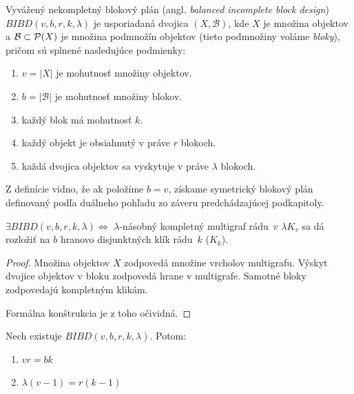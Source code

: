 \begin{definition}

Vyvážený nekompletný blokový plán (angl. \emph{balanced incomplete block design}) $BIBD(v, b, r, k, \lambda)$ je usporiadaná dvojica $(X, \mathcal{B})$, kde $X$ je množina objektov a $\mathcal{B} \subset \mathcal{P}(X)$ je množina podmnožín objektov (tieto podmnožiny voláme \emph{bloky}), pričom sú splnené nasledujúce podmienky:

\begin{enumerate}
    \item $v = |X|$ je mohutnosť množiny objektov.
    \item $b = |\mathcal{B}|$ je mohutnosť množiny blokov.
    \item každý blok má mohutnosť $k$.
    \item každý objekt je obsiahnutý v práve $r$ blokoch.
    \item každá dvojica objektov sa vyskytuje v práve $\lambda$ blokoch. 
\end{enumerate}
\end{definition}

\begin{remark}
	Z definície vidno, že ak položíme $b = v$, získame symetrický blokový plán definovaný podľa duálneho pohľadu zo záveru predchádzajúcej podkapitoly.
\end{remark}

\begin{theorem}
$\exists BIBD(v, b, r, k, \lambda) \Longleftrightarrow $ $\lambda$-násobný kompletný multigraf rádu~$v$ $\lambda K_v$
sa dá rozložiť na $b$ hranovo disjunktných klík rádu~$k$ ($K_k$).
\end{theorem}


\begin{proof}
Množina objektov $X$ zodpovedá množine vrcholov multigrafu. 
Výskyt dvojice objektov v bloku zodpovedá hrane v multigrafe.
Samotné bloky zodpovedajú kompletným klikám.

Formálna konštrukcia je z toho očividná.
\end{proof}

\begin{theorem}
\label{th:bibd_params}
Nech existuje $BIBD(v, b, r, k, \lambda)$. Potom:
\begin{enumerate}
    \item $vr = bk$
    \item $\lambda (v-1) = r (k-1)$
\end{enumerate}
\end{theorem}


